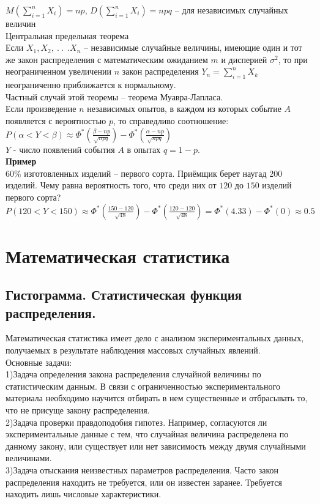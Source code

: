 \documentclass[russian, 12pt, fleqn]{article}
\begin{document}
$M(\displaystyle{\sum\limits_{i = 1}^{n}} X_i) = np$, $D(\displaystyle{\sum\limits_{i = 1}^{n}} X_i) = npq$ -- для независимых случайных величин\\
$\textbf{Центральная предельная теорема}$\\
Если $X_1,$$ X_2,\ .\ .\ \ . X_n$ -- независимые случайные  величины, имеющие один и тот же закон распределения с математическим ожиданием $m$ и дисперией $\sigma^2$,
то при неограниченном увеличении $n$ закон распределения $Y_n = \displaystyle{\sum\limits_{i = 1}^{n}} X_k$ неограниченно приближается к нормальному.\\
Частный случай этой теоремы -- теорема Муавра-Лапласа.\\
Если произведение $n$ независимых опытов, в каждом из которых событие $A$ появляется с вероятностью $p$, то справедливо соотношение:
\\ $P(\alpha < Y < \beta) \approx \Phi^*(\frac{\beta - np}{\sqrt{npq}}) - \Phi^*(\frac{\alpha - np}{\sqrt{npq}})$\\
$Y$ - число появлений события $A$  в опытах $q = 1 - p$.\\
\textbf{Пример} \\
$60 \%$ изготовленных изделий -- первого сорта. Приёмщик берет наугад 200 изделий. Чему равна вероятность того, что среди них от $120$ до $150$ изделий первого сорта?\\
$P(120 < Y < 150) \approx \Phi^*(\frac{150-120}{\sqrt{48}}) - \Phi^*(\frac{120 - 120}{\sqrt{48}}) = \Phi^*(4.33) - \Phi^*(0)  \approx 0.5$ \\
\section{Математическая статистика}
\subsection{Гистограмма. Статистическая функция распределения.}
\noindent
Математическая статистика имеет дело с анализом экспериментальных данных, получаемых в результате наблюдения массовых случайных явлений.\\
Основные задачи:\\
1)Задача определения закона распределения случайной величины по статистическим данным. В связи с ограниченностью 
экспериментального материала необходимо научится отбирать в нем существенные и отбрасывать то, что не присуще закону распределения.\\
2)Задача проверки правдоподобия гипотез. Например, согласуются ли 
экспериментальные данные с тем, что случайная величина распределена по данному закону, или существует или нет зависимость между двумя случайными величинами.\\
3)Задача отыскания неизвестных параметров распределения. Часто закон распределения находить не требуется, или он известен заранее. Требуется находить лишь числовые характеристики.\\
\end{document}
